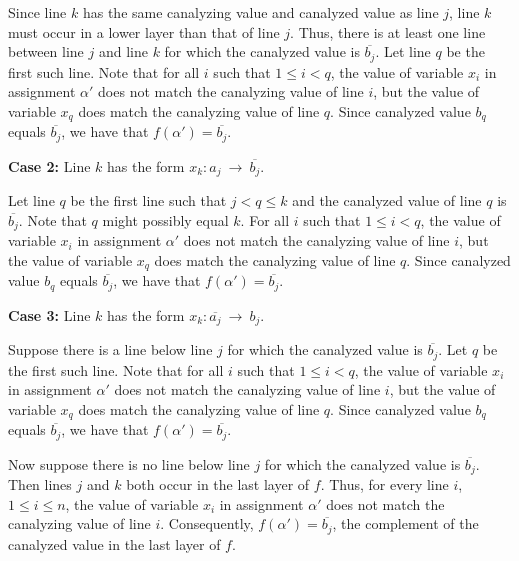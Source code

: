 \smallskip

Since line $k$ has
the same canalyzing value and canalyzed value as line $j$, line
$k$ must occur in a lower layer than that of line $j$.  Thus, there
is at least one line between line $j$ and line $k$ for which the
canalyzed value is $\overline{b_j}$.  Let line $q$ be the first
such line.  Note that for all $i$ such that $1 \leq i < q$, the
value of variable $x_i$ in assignment $\alpha'$ does not match the
canalyzing value of line $i$, but the value of variable $x_q$ does
match the canalyzing value of line $q$.  Since canalyzed value
$b_q$ equals $\overline{b_j}$, we have that $f(\alpha') =
\overline{b_j}$.

\medskip

\noindent
{\bf Case 2:} Line $k$ has the form  $x_k : a_j ~\longrightarrow~ \overline{b_j}$.  

\smallskip

Let line $q$ be the first line such that $j < q \leq k$ and the canalyzed
value of line $q$ is $\overline{b_j}$.  Note that $q$ might possibly
equal $k$.  For all $i$ such that $1 \leq i < q$, the value of
variable $x_i$ in assignment $\alpha'$ does not match the canalyzing
value of line $i$, but the value of variable $x_q$ does match the
canalyzing value of line $q$.  Since canalyzed value $b_q$ equals
$\overline{b_j}$, we have that $f(\alpha') = \overline{b_j}$.

\medskip

\noindent
{\bf Case 3:} Line $k$ has the form $x_k : \overline{a_j} ~\longrightarrow~ b_j$.  

\smallskip

Suppose there is a line below line $j$ for which the canalyzed value is
$\overline{b_j}$.  Let $q$ be the first such line.  Note that for
all $i$ such that $1 \leq i < q$, the value of variable $x_i$ in
assignment $\alpha'$ does not match the canalyzing value of line
$i$, but the value of variable $x_q$ does match the canalyzing value
of line $q$.  Since canalyzed value $b_q$ equals $\overline{b_j}$,
we have that $f(\alpha') = \overline{b_j}$.

\smallskip

Now suppose there is no line below line $j$ for which the canalyzed
value is $\overline{b_j}$.  Then lines $j$ and $k$ both occur in
the last layer of $f$.  Thus, for every line $i$, $1 \leq i \leq
n$, the value of variable $x_i$ in assignment $\alpha'$ does not
match the canalyzing value of line $i$.  Consequently, $f(\alpha')
= \overline{b_j}$, the complement of the canalyzed value in the
last layer of $f$.

